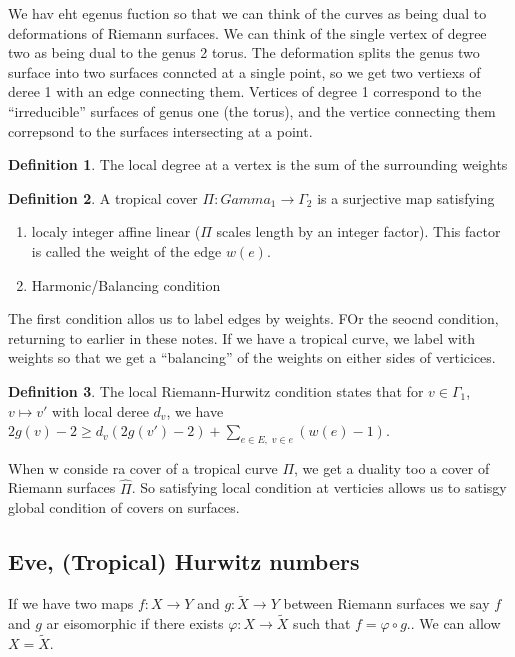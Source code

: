 \documentclass[12pt]{memoir}
\theoremstyle{definition}
\newtheorem{protodefinition}{Definition}[section]
\newenvironment{define}
   {\begin{protodefinition}}
   {\end{protodefinition}}
\begin{document}
We hav eht egenus fuction so that we can think of the curves as being dual to deformations of Riemann surfaces.
    We can think of the single vertex of degree two as being dual to the genus 2 torus. The deformation splits the genus two surface into two surfaces conncted at a single point, so we get two vertiexs of deree 1 with an edge connecting them. Vertices of degree 1 correspond to the ``irreducible'' surfaces of genus one (the torus), and the vertice connecting them correpsond to the surfaces intersecting at a point.
    \begin{define}
        The local degree at a vertex is the sum of the surrounding weights
    \end{define}
\begin{define}
    A tropical cover $\Pi: Gamma_1 \rightarrow \Gamma_2$ is a surjective map satisfying
    \begin{enumerate}
        \item localy integer affine linear ($\Pi$ scales length by an integer factor). This factor is called the weight of the edge $w(e)$.
        \item Harmonic/Balancing condition
    \end{enumerate}
\end{define}

The first condition allos us to label edges by weights. FOr the seocnd condition, returning to earlier in these notes. If we have a tropical curve, we label with weights so that we get a ``balancing'' of the weights on either sides of verticices.



\begin{define}
    The local Riemann-Hurwitz condition states that for $v \in \Gamma_1$, $v \mapsto v'$ with local deree $d_v$, we have $2g(v) - 2 \geq d_v(2g(v')-2) + \sum\limits_{e \in E, \; v \in e} (w(e) -1)$.
\end{define}


When w conside ra cover of a tropical curve $\Pi$, we get a duality too a cover of Riemann surfaces $\hat{\Pi}$. So satisfying local condition at verticies allows us to satisgy global condition of covers on surfaces.



\subsection{Eve, (Tropical) Hurwitz numbers}


If we have two maps $f:X \rightarrow Y$ and $g: \tilde{X} \rightarrow Y$ between Riemann surfaces we say $f$ and $g$ ar eisomorphic if there exists $\varphi:X \rightarrow \tilde{X}$ such that $f= \varphi \circ g$.. We can allow $X=\tilde{X}$.
\end{document}
